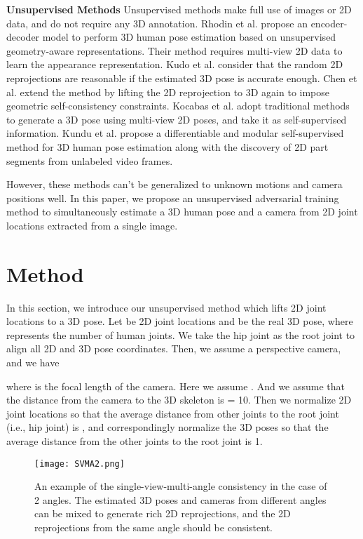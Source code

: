 \documentclass[10pt,twocolumn,letterpaper]{article}
\begin{document}
\noindent
{\bf Unsupervised Methods} Unsupervised methods make full use of images or 2D data, and do not require any 3D annotation. Rhodin et al.\cite{2018Unsupervised1} propose an encoder-decoder model to perform 3D human pose estimation based on unsupervised geometry-aware representations. Their method requires multi-view 2D data to learn the appearance representation. Kudo et al.\cite{2018Unsupervised} consider that the random 2D reprojections are reasonable if the estimated 3D pose is accurate enough. Chen et al.\cite{2020Unsupervised} extend the method\cite{2018Unsupervised} by lifting the 2D reprojection to 3D again to impose geometric self-consistency constraints.  Kocabas et al.\cite{2019Self} adopt traditional methods to generate a 3D pose using multi-view 2D poses, and take it as self-supervised information. Kundu et al.\cite{2020Kundu} propose a differentiable and modular self-supervised method for 3D human pose estimation along with the discovery of 2D part segments from unlabeled video frames. 

However, these methods can't be generalized to unknown motions and camera positions well. In this paper, we propose an unsupervised adversarial training method to simultaneously estimate a 3D human pose and a camera from 2D joint locations extracted from a single image.

\section{Method}
In this section, we introduce our unsupervised method which lifts 2D joint locations to a 3D pose.
Let  be 2D joint locations and  be the real 3D pose, where  represents the number of human joints. 
We take the hip joint as the root joint to align all 2D and 3D pose coordinates. Then, 
we assume a perspective camera, and we have


where  is the focal length of the camera. Here we assume . 
And we assume that the distance from the camera to the 3D skeleton is  = 10. 
Then we normalize 2D joint locations so that the average distance from other joints to the root joint (i.e., hip joint) is , and correspondingly normalize the 3D poses so that the average distance from the other joints to the root joint is 1.

\begin{figure}[t]
\centering
\texttt{[image: SVMA2.png]}
\caption{An example of the single-view-multi-angle consistency in the case of 2 angles. The estimated 3D poses and cameras from different angles can be mixed to generate rich 2D reprojections, and the 2D reprojections from the same angle should be consistent.}
\label{SVMA}
\end{figure}
\end{document}
